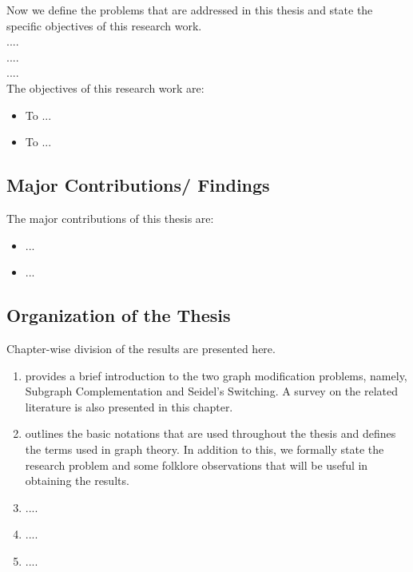 \documentclass[12pt,A4paper]{article}
\begin{document}
 Now we define the problems that are addressed in this thesis and state the specific objectives of this research work.\\
 ....\\
 ....\\
 ....\\
 The objectives of this research work are:
 \begin{itemize}
    \item To ...  
    \item To ...
\end{itemize} 

\subsection{Major Contributions/ Findings}
The major contributions of this thesis are:
\begin{itemize}

    \item ...  
    \item ...
\end{itemize} 

\subsection{Organization of the Thesis}
Chapter-wise division of the results are presented here.

 \begin{enumerate}[label=\textbf{Chapter \arabic*},leftmargin=*]\setcounter{enumi}{0}

    \item provides a brief introduction to the two graph modification problems, namely, Subgraph Complementation and Seidel's Switching.  A survey on the related literature is also presented in this chapter.

\vspace{-0.2cm}
    \item   outlines the basic notations that are used throughout the thesis and defines the terms used in graph theory. In addition to this, we formally state the research problem and some folklore observations that will be useful in obtaining the results.
\vspace{-0.2cm}
    \item ....
\vspace{-0.2cm}
    \item ....
\vspace{-0.2cm}
    \item ....

\end{enumerate}
\end{document}
